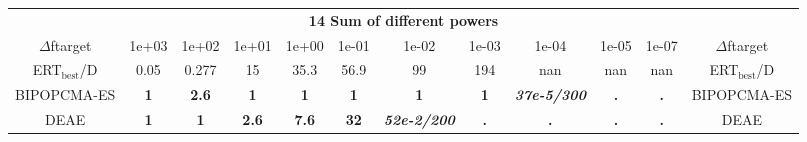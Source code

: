 \begin{tabular}{cccccccccccc}
 & \multicolumn{10}{c}{{\normalsize \textbf{14 Sum of different powers}}}\\
$\Delta$ftarget& 1e+03& 1e+02& 1e+01& 1e+00& 1e-01& 1e-02& 1e-03& 1e-04& 1e-05& 1e-07 & $\Delta$ftarget \\
ERT$_{\textrm{best}}$/D& 0.05& 0.277& 15& 35.3& 56.9& 99& 194& nan& nan& nan & ERT$_{\textrm{best}}$/D \\
\hline
BIPOPCMA-ES & \textbf{1} & \textbf{2.6} & \textbf{1} & \textbf{1} & \textbf{1} & \textbf{1} & \textbf{1} & \textbf{\textit{37e-5}\textit{/300}} & \textbf{.} & \textbf{.} & BIPOPCMA-ES \cite{add_an_entry_for_BIPOPCMA-ES_in_bbob.bib}\\
DEAE & \textbf{1} & \textbf{1} & \textbf{2.6} & \textbf{7.6} & \textbf{32} & \textbf{\textit{52e-2}\textit{/200}} & \textbf{.} & \textbf{.} & \textbf{.} & \textbf{.} & DEAE \cite{add_an_entry_for_DEAE_in_bbob.bib}
\end{tabular}
